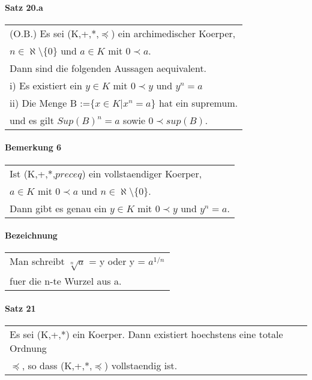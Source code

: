\documentclass[a4paper]{scrartcl}
\begin{document}
\paragraph{Satz 20.a}
\begin{tabbing}
\begin{tabular}{l}
(O.B.) Es sei (K,+,*,$\preceq$) ein archimedischer Koerper,\\
$n\in \aleph \setminus \{ 0\}$ und $a\in K$ mit $0\prec a$.\\
Dann sind die folgenden Aussagen aequivalent.\\
i) Es existiert ein $y\in K$ mit $0\prec y$ und $y^n=a$\\
ii) Die Menge B :=$\{ x\in K| x^n=a\}$ hat ein supremum.\\
und es gilt $Sup(B)^n=a$ sowie $0\prec sup(B)$.\\
\end{tabular}
\end{tabbing}

\paragraph{Bemerkung 6}
\begin{tabbing}
\begin{tabular}{l}
Ist (K,+,*,$preceq$) ein vollstaendiger Koerper,\\
$a \in K $ mit $0 \prec a$ und $n \in \aleph \setminus \{ 0\}$.\\
Dann gibt es genau ein $y \in K$ mit $0\prec y$ und $y^n = a$.
\end{tabular}
\end{tabbing}

\paragraph{Bezeichnung}
\begin{tabbing}
\begin{tabular}{l}
Man schreibt $ \sqrt[n]{a}$ = y oder y = $a^{1/n}$\\
fuer die n-te Wurzel aus a.
\end{tabular}
\end{tabbing}

\paragraph{Satz 21}
\begin{tabbing}
\begin{tabular}{l}
Es sei (K,+,*) ein Koerper. Dann existiert hoechstens eine totale Ordnung\\
$\preceq$, so dass (K,+,*,$\preceq$) vollstaendig ist. 
\end{tabular}
\end{tabbing}
\end{document}
